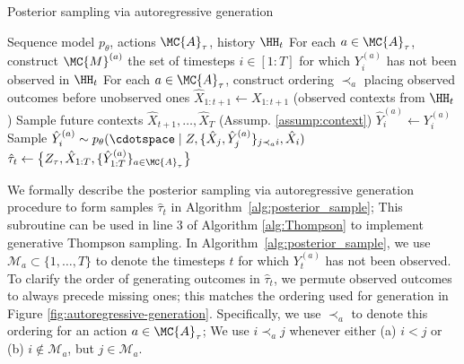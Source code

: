 \begin{algorithm}[h]
  \caption{Posterior sampling via autoregressive generation}
  \label{alg:posterior_sample}
  \begin{algorithmic}[1]
    \REQUIRE Sequence model $p_{\theta}$, actions $\MC{A}_{\tau}$, history $\HH_t$
    \STATE For each $a \in \MC{A}_{\tau}$, construct $\MC{M}^{(a)}$ the set of timesteps $i \in [1 \colon T]$ for which $Y_i^{(a)}$ has not been observed in $\HH_t$
    \STATE For each $a \in \MC{A}_{\tau}$, construct ordering $\prec_{a}$ placing observed outcomes before unobserved ones
    \STATE $\hat{X}_{1:t+1} \gets X_{1:t+1}$ (observed contexts from $\HH_t$)
    \STATE Sample future contexts $\hat{X}_{t+1}, \dots, \hat{X}_T$ (Assump. \ref{assump:context})
            \STATE $\hat{Y}_i^{(a)} \gets Y_i^{(a)}$
        \ELSE
            \STATE Sample $\hat{Y}_i^{(a)} \sim p_{\theta}(\cdotspace \mid Z, \{\hat{X}_j, \hat{Y}_j^{(a)} \}_{j \prec_{a} i}, \hat{X}_i )$
        \ENDIF
    \ENDFOR
    \ENDFOR
    \STATE {} \, $\hat{\tau}_t \gets \big\{ Z_\tau, \hat{X}_{1:T}, \{ \hat{Y}_{1:T}^{(a)} \}_{a \in \MC{A}_{\tau}} \big\}$
  \end{algorithmic}
\end{algorithm}

We formally describe the posterior sampling via autoregressive generation procedure to form samples $\hat{\tau}_t$ in Algorithm~\ref{alg:posterior_sample}; This subroutine can be used in line 3 of Algorithm \ref{alg:Thompson} to implement generative Thompson sampling. In Algorithm~\ref{alg:posterior_sample}, we use $\mathcal{M}_a \subset \{1,\ldots,T\}$ to denote the timesteps $t$ for which $Y_t^{(a)}$ has not been observed. 
To clarify the order of generating outcomes in $\hat{\tau}_t$, we permute observed outcomes to always precede missing ones; this matches the ordering used for generation in Figure \ref{fig:autoregressive-generation}. 
Specifically, we use $\prec_a$ to denote this ordering for an action $a \in \MC{A}_{\tau}$; We use $i\prec_a j$ whenever either (a) $i < j$ or (b) $i \notin \mathcal{M}_a$, but $j \in \mathcal{M}_a$.






